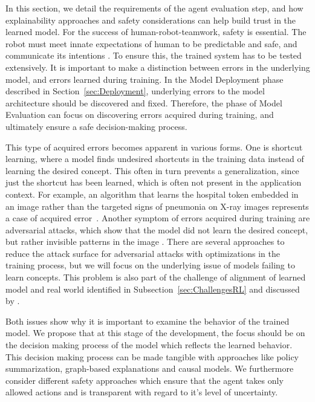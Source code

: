 \documentclass[twoside,11pt]{article}
\begin{document}
\begin{enumerate}
In this section, we detail the requirements of the agent evaluation step, and how explainability approaches and safety considerations can help build trust in the learned model. For the success of human-robot-teamwork, safety is essential. The robot must meet innate expectations of human to be predictable and safe, and communicate its intentions \citep{EderHarperLeonards:2014:HITLRoboticsSafetyAssurance}. To ensure this, the trained system has to be tested extensively. It is important to make a distinction between errors in the underlying model, and errors learned during training. In the Model Deployment phase described in Section~\ref{sec:Deployment}, underlying errors to the model architecture should be discovered and fixed. Therefore, the phase of Model Evaluation can focus on discovering errors acquired during training, and ultimately ensure a safe decision-making process.

This type of acquired errors becomes apparent in various forms. One is shortcut learning, where a model finds undesired shortcuts in the training data instead of learning the desired concept. This often in turn prevents a generalization, since just the shortcut has been learned, which is often not present in the application context. For example, an algorithm that learns the hospital token embedded in an image rather than the targeted signs of pneumonia on X-ray images represents a case of acquired error~\citep{GeirhosEtAl:2020:ShortcutLearningDNN}. 
Another symptom of errors acquired during training are adversarial attacks, which show that the model did not learn the desired concept, but rather invisible patterns in the image \citep{GoodfellowShlensSzegedy:2014:AdversarialExamples}. There are several approaches to reduce the attack surface for adversarial attacks with optimizations in the training process, but we will focus on the underlying issue of models failing to learn concepts. This problem is also part of the challenge of alignment of learned model and real world identified in Subsection~\ref{sec:ChallengesRL} and discussed by \citet{RoyEtAl:2021:RLRoboticsChallenges}.

Both issues show why it is important to examine the behavior of the trained model. We propose that at this stage of the development, the focus should be on the decision making process of the model which reflects the learned behavior. This decision making process can be made tangible with approaches like policy summarization, graph-based explanations and causal models. We furthermore consider different safety approaches which ensure that the agent takes only allowed actions and is transparent with regard to it's level of uncertainty.


\end{enumerate}
\end{document}
